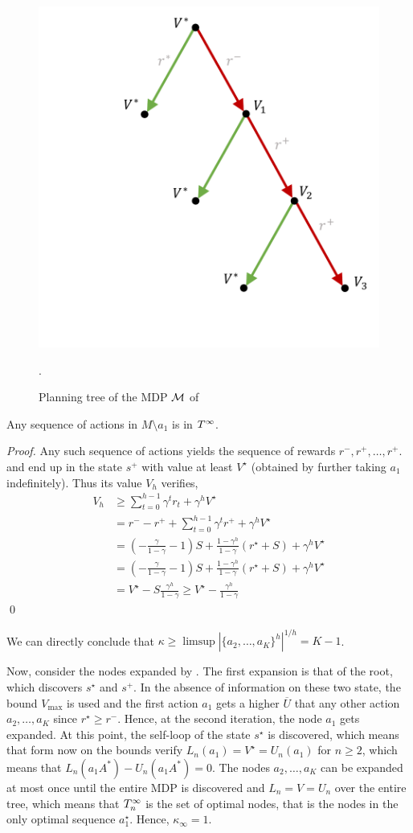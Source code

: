 \documentclass[runningheads]{llncs}
\begin{document}
\begin{figure}
    \centering
    \includegraphics[trim={3.5cm 2cm 0.5cm 0.5cm}, clip, width=0.6\linewidth]{img/mdp_tree.pdf}
    \caption{Planning tree of the MDP $\mathcal{M}$ of }.
    \label{fig:mdp-tree}
\end{figure}
\begin{lemma}
 Any sequence of actions in $M\setminus{a_1}$ is in $T^\infty$.
\end{lemma}
\begin{proof}
Any such sequence of actions yields the sequence of rewards $r^-, r^+, \dots,r^+$. and end up in the state $s^+$ with value at least $V^\star$ (obtained by further taking $a_1$ indefinitely). Thus its value $V_h$ verifies, 
\begin{align*}
    V_h &\geq \sum_{t=0}^{h-1} \gamma^t r_t + \gamma^h V^\star\\
    &= r^- - r^+ + \sum_{t=0}^{h-1} \gamma^t r^+ + \gamma^h V^\star \\
    &= (-\frac{\gamma}{1-\gamma} - 1)S + \frac{1-\gamma^h}{1-\gamma} (r^\star + S) + \gamma^h V^\star\\
    &= (-\frac{\gamma}{1-\gamma} - 1)S + \frac{1-\gamma^h}{1-\gamma} (r^\star + S) + \gamma^h V^\star\\
    &= V^\star - S\frac{\gamma^h}{1-\gamma} \geq V^\star - \frac{\gamma^h}{1-\gamma}
\end{align*}
\qed\end{proof}

We can directly conclude that $\kappa \geq \limsup{|\{a_2,\dots,a_K\}^h|^{1/h}} = K-1$.

Now, consider the nodes expanded by . The first expansion is that of the root, which discovers $s^\star$ and $s^+$. In the absence of information on these two state, the bound $V_{\max}$ is used and the first action $a_1$ gets a higher $\overline{U}$ that any other action $a_2,\dots,a_K$ since $r^\star \geq r^-$. Hence, at the second iteration, the node $a_1$ gets expanded. At this point, the self-loop of the state $s^\star$ is discovered, which means that form now on the bounds verify $L_n(a_1) = V^\star = U_n(a_1)$ for $n\geq2$, which means that $L_n(a_1A^*)-U_n(a_1A^*) = 0$. The nodes $a_2,\dots,a_K$ can be expanded at most once until the entire MDP is discovered and $L_n=V=U_n$ over the entire tree, which means that $T_n^\infty$ is the set of optimal nodes, that is the nodes in the only optimal sequence $a_1^\star$. Hence, $\kappa_\infty = 1.$ 
\end{document}
